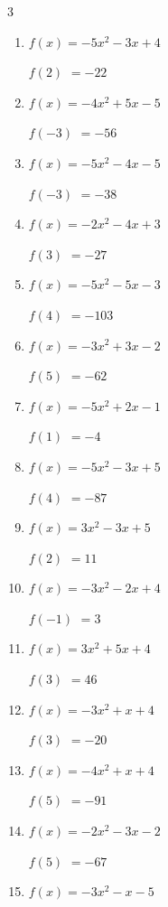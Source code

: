 \begin{multicols}{3}
\begin{enumerate}
$f(2)$
        $= -8$

\columnbreak %

  \item $f(x)=-5x^{2}-3x+4$

$f(2)$
        $= -22$

  \item $f(x)=-4x^{2}+5x-5$

$f(-3)$
        $= -56$

  \item $f(x)=-5x^{2}-4x-5$

$f(-3)$
        $= -38$

  \item $f(x)=-2x^{2}-4x+3$

$f(3)$
        $= -27$

  \item $f(x)=-5x^{2}-5x-3$

$f(4)$
        $= -103$

  \item $f(x)=-3x^{2}+3x-2$

$f(5)$
        $= -62$

  \item $f(x)=-5x^{2}+2x-1$

$f(1)$
        $= -4$

  \item $f(x)=-5x^{2}-3x+5$

$f(4)$
        $= -87$

  \item $f(x)=3x^{2}-3x+5$

$f(2)$
        $= 11$

  \item $f(x)=-3x^{2}-2x+4$

$f(-1)$
        $= 3$

  \item $f(x)=3x^{2}+5x+4$

$f(3)$
        $= 46$

  \item $f(x)=-3x^{2}+x+4$

$f(3)$
        $= -20$

  \item $f(x)=-4x^{2}+x+4$

$f(5)$
        $= -91$

  \item $f(x)=-2x^{2}-3x-2$

$f(5)$
        $= -67$

  \item $f(x)=-3x^{2}-x-5$


\end{enumerate}
\end{multicols}
